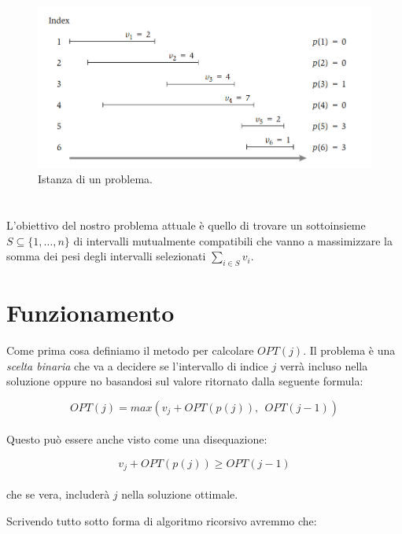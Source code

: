 \begin{figure}[H]
    \centering
    \includegraphics[width=12cm, keepaspectratio]{capitoli/imgs/weighted_problem.png}
    \caption{Istanza di un problema.}
\end{figure}

\section{\goal}

L'obiettivo del nostro problema attuale è quello di trovare un sottoinsieme $S
    \subseteq \{1, \ldots, n\}$ di intervalli mutualmente compatibili che vanno a
massimizzare la somma dei pesi degli intervalli selezionati $\sum_{i \in S}
    v_i$.

\section{Funzionamento}

Come prima cosa definiamo il metodo per calcolare $OPT(j)$. Il problema è
una \textit{scelta binaria} che va a decidere se l'intervallo di indice $j$
verrà incluso nella soluzione oppure no basandosi sul valore ritornato dalla
seguente formula:

\begin{equation}
    \label{eqn:weight-opt}
    OPT(j) = max(v_j + OPT(p(j)), \ \ OPT(j-1))
\end{equation}
\ \\
Questo può essere anche visto come una disequazione:

\begin{equation}
    \label{eqn:weight-opt-dis}
    v_j + OPT(p(j)) \geq OPT(j-1)
\end{equation}
\ \\
che se vera, includerà $j$ nella soluzione ottimale.

\pagebreak

Scrivendo tutto sotto forma di algoritmo ricorsivo avremmo che:

